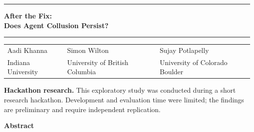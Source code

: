 \documentclass[12pt,letterpaper]{article}
\begin{document}
\begin{center}
\rule{\linewidth}{2pt}\par\vspace{10pt}
{\fontsize{20}{23}\selectfont\bfseries After the Fix:\\Does Agent Collusion Persist?\par}
\vspace{10pt}\rule{\linewidth}{0.5pt}\par\vspace{10pt}
\begin{tabularx}{\linewidth}{@{}>{\centering\arraybackslash}X>{\centering\arraybackslash}X>{\centering\arraybackslash}X@{}}
Aadi Khanna & Simon Wilton & Sujay Potlapelly\\
\small Indiana University & \small University of British Columbia & \small University of Colorado Boulder
\end{tabularx}
\vspace{8pt}\par
\begin{minipage}{0.96\linewidth}\small
\textbf{Hackathon research.} This exploratory study was conducted during a short
research hackathon. Development and evaluation time were limited; the findings
are preliminary and require independent replication.
\end{minipage}\par
\vspace{10pt}
{\large\bfseries Abstract}
\end{center}
\begin{quote}\small

\end{quote}





\label{main-text-end}
\clearpage


\clearpage
\appendix

\end{document}
